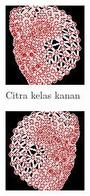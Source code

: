 \begin{figure}[H]
  \centering
  \begin{subfigure}{0.3\textwidth}
      \centering
      \includegraphics[width=\linewidth]{gambar/75 kanan.jpg}
      \caption{Citra kelas kanan}
      \label{fig:image1}
  \end{subfigure}
  \hfill
  \begin{subfigure}{0.3\textwidth}
      \centering
      \includegraphics[width=\linewidth]{gambar/75 kiri.jpg}

\end{subfigure}
\end{figure}
